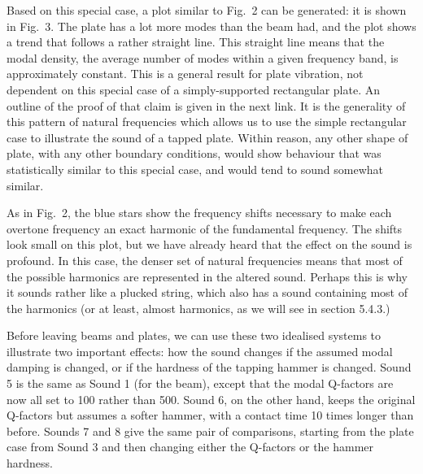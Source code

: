 
  Based on this special case, a plot similar to Fig.\ 2 can be generated: it is 
  shown in Fig.\ 3. The plate has a lot more modes than the beam had, and the 
  plot shows a trend that follows a rather straight line. This straight line 
  means that the modal density, the average number of modes within a given 
  frequency band, is approximately constant. This is a general result for plate 
  vibration, not dependent on this special case of a simply-supported 
  rectangular plate. An outline of the proof of that claim is given in the next 
  link. It is the generality of this pattern of natural frequencies which 
  allows us to use the simple rectangular case to illustrate the sound of a 
  tapped plate. Within reason, any other shape of plate, with any other 
  boundary conditions, would show behaviour that was statistically similar to 
  this special case, and would tend to sound somewhat similar. 

  As in Fig.\ 2, the blue stars show the frequency shifts necessary to make 
  each overtone frequency an exact harmonic of the fundamental frequency. The 
  shifts look small on this plot, but we have already heard that the effect on 
  the sound is profound. In this case, the denser set of natural frequencies 
  means that most of the possible harmonics are represented in the altered 
  sound. Perhaps this is why it sounds rather like a plucked string, which also 
  has a sound containing most of the harmonics (or at least, almost harmonics, 
  as we will see in section 5.4.3.) 

  Before leaving beams and plates, we can use these two idealised systems to 
  illustrate two important effects: how the sound changes if the assumed modal 
  damping is changed, or if the hardness of the tapping hammer is changed. 
  Sound 5 is the same as Sound 1 (for the beam), except that the modal 
  Q-factors are now all set to 100 rather than 500. Sound 6, on the other hand, 
  keeps the original Q-factors but assumes a softer hammer, with a contact time 
  10 times longer than before. Sounds 7 and 8 give the same pair of 
  comparisons, starting from the plate case from Sound 3 and then changing 
  either the Q-factors or the hammer hardness. 

